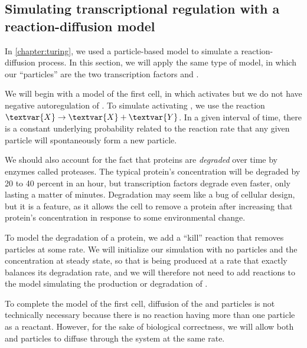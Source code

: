 \subsection{Simulating transcriptional regulation with a reaction-diffusion model}

In \autoref{chapter:turing}, we used a particle-based model to simulate a reaction-diffusion process. In this section, we will apply the same type of model, in which our ``particles'' are the two transcription factors  and .

We will begin with a model of the first cell, in which  activates  but we do not have negative autoregulation of . To simulate  activating , we use the reaction $\textvar{X} \rightarrow \textvar{X} + \textvar{Y}$. In a given interval of time, there is a constant underlying probability related to the reaction rate that any given  particle will spontaneously form a new  particle.

We should also account for the fact that proteins are \textit{degraded} over time by enzymes called proteases. The typical protein's concentration will be degraded by 20 to 40 percent in an hour, but transcription factors degrade even faster, only lasting a matter of minutes. Degradation may seem like a bug of cellular design, but it is a feature, as it allows the cell to remove a protein after increasing that protein's concentration in response to some environmental change.

To model the degradation of a protein, we add a ``kill'' reaction that removes  particles at some rate. We will initialize our simulation with no  particles and the  concentration at steady state, so that  is being produced at a rate that exactly balances its degradation rate, and we will therefore not need to add reactions to the model simulating the production or degradation of .

To complete the model of the first cell, diffusion of the  and  particles is not technically necessary because there is no reaction having more than one particle as a reactant. However, for the sake of biological correctness, we will allow both  and  particles to diffuse through the system at the same rate.\\

\begin{qbox}\end{qbox}

